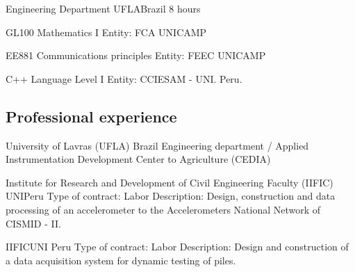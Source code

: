 \documentclass[11pt,a4paper,sans]{moderncv} %
\begin{document}
	      {Engineering Department}
	      {UFLA}{Brazil}
	      {8 hours}

			  {GL100 }{Mathematics I}{}
			  {Entity: FCA UNICAMP }

			  {EE881 }{Communications principles}{}
			  {Entity: FEEC UNICAMP }

	      {C++ Language}{ Level I}{}
	      {Entity: CCIESAM - UNI. Peru.}

\subsection{Professional experience}
	      {University of Lavras (UFLA)}
	      {}{Brazil}
	      {Engineering department / Applied Instrumentation Development Center to Agriculture (CEDIA) }


		      {Institute for Research and Development of Civil Engineering Faculty (IIFIC)}
		      {UNI}{Peru}
		      {Type of contract: Labor\newline{}
		      Description: Design, construction and data processing of an accelerometer 
		      to the Accelerometers National Network  of CISMID - II.}

		      {IIFIC}{UNI }{Peru}
		      {Type of contract: Labor\newline{}
		      Description: Design and construction  of  a data acquisition system for dynamic testing of piles.}



\end{document}
